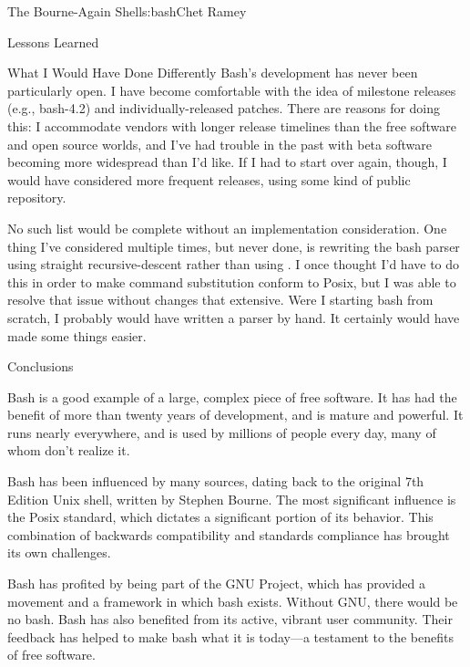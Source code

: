 \begin{aosachapter}{The Bourne-Again Shell}{s:bash}{Chet Ramey}
\begin{aosasect1}{Lessons Learned}
\begin{aosasect2}{What I Would Have Done Differently}
Bash's development has never been particularly open.  I have become
comfortable with the idea of milestone releases (e.g., bash-4.2) and
individually-released patches.  There are reasons for doing this: I
accommodate vendors with longer release timelines than the free
software and open source worlds, and I've had trouble in the past with
beta software becoming more widespread than I'd like.  If I had to
start over again, though, I would have considered more frequent
releases, using some kind of public repository.

No such list would be complete without an implementation
consideration.  One thing I've considered multiple times, but never
done, is rewriting the bash parser using straight recursive-descent
rather than using .  I once thought I'd have to do this in
order to make command substitution conform to Posix, but I was able to
resolve that issue without changes that extensive.  Were I starting
bash from scratch, I probably would have written a parser by hand.  It
certainly would have made some things easier.

\end{aosasect2}

\end{aosasect1}

\begin{aosasect1}{Conclusions}

Bash is a good example of a large, complex piece of free software.  It
has had the benefit of more than twenty years of development, and is
mature and powerful.  It runs nearly everywhere, and is used by
millions of people every day, many of whom don't realize it.

Bash has been influenced by many sources, dating back to the original
7th Edition Unix shell, written by Stephen Bourne.  The most
significant influence is the Posix standard, which dictates a
significant portion of its behavior.  This combination of backwards
compatibility and standards compliance has brought its own challenges.

Bash has profited by being part of the GNU Project, which has provided
a movement and a framework in which bash exists.  Without GNU, there
would be no bash.  Bash has also benefited from its active, vibrant
user community.  Their feedback has helped to make bash what it is
today---a testament to the benefits of free software.

\end{aosasect1}

\end{aosachapter}
